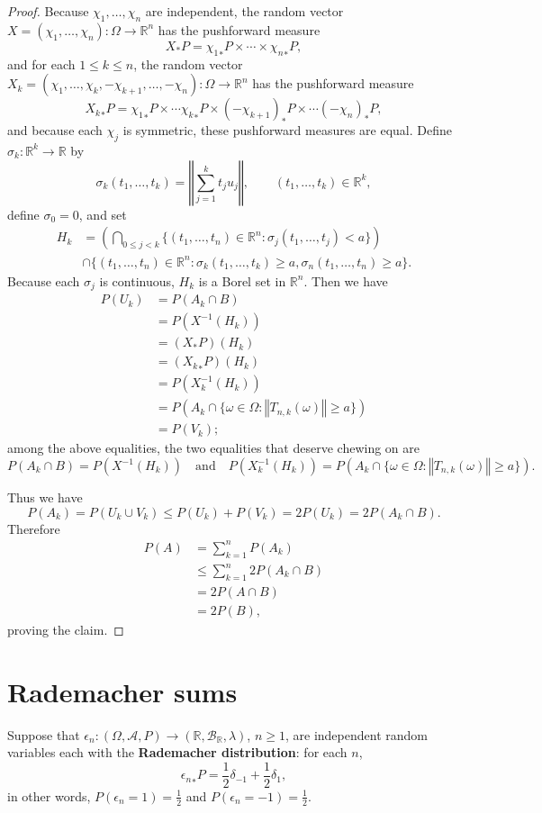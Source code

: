 \documentclass{article}
\newcommand{\norm}[1]{\left\Vert #1 \right\Vert}
\theoremstyle{definition}
\begin{document}
\begin{proof}
Because $\chi_1,\ldots,\chi_n$  are independent,
the random vector $X=(\chi_1,\ldots,\chi_n):\Omega \to \mathbb{R}^n$ has the pushforward measure
\[	
X_*P = {\chi_1}_*P \times \cdots  \times {\chi_n}_*P,
\]
 and for each $1 \leq k \leq n$, the random vector
$X_k=(\chi_1,\ldots,\chi_k,-\chi_{k+1},\ldots,-\chi_n):\Omega \to \mathbb{R}^n$ has the pushforward measure
\[
{X_k}_*P={\chi_1}_*P \times \cdots {\chi_k}_*P \times {(-\chi_{k+1})}_*P \times \cdots {(-\chi_n)}_*P,
\]
and because each $\chi_j$ is symmetric, these pushforward measures are equal. 
Define $\sigma_k:\mathbb{R}^k \to \mathbb{R}$ by
\[
\sigma_k(t_1,\ldots,t_k) = \norm{\sum_{j=1}^k t_j u_j}, \qquad (t_1,\ldots,t_k) \in \mathbb{R}^k,
\]
define $\sigma_0=0$,
and set
\begin{align*}
H_k& = \left( \bigcap_{0 \leq j < k} \{(t_1,\ldots,t_n) \in \mathbb{R}^n: \sigma_j(t_1,\ldots,t_j)<a\} \right)\\
& \cap \{(t_1,\ldots,t_n) \in \mathbb{R}^n:
\sigma_k(t_1,\ldots,t_k) \geq a, \sigma_n(t_1,\ldots,t_n) \geq a\}.
\end{align*}
Because each $\sigma_j$ is continuous, $H_k$ is a Borel set in $\mathbb{R}^n$.
Then we have
\begin{align*}
P(U_k)&=P(A_k \cap B)\\
&=P(X^{-1}(H_k))\\
&=(X_*P)(H_k)\\
&=({X_k}_*P)(H_k)\\
&=P(X_k^{-1}(H_k))\\
&=P(A_k \cap \{\omega \in \Omega: \norm{T_{n,k}(\omega)} \geq a\})\\
&=P(V_k);
\end{align*}
among the above equalities, the two equalities that deserve chewing on are
\[
P(A_k \cap B) = P(X^{-1}(H_k)) \quad \textrm{and} \quad P(X_k^{-1}(H_k)) = P(A_k \cap \{\omega \in \Omega: \norm{T_{n,k}(\omega)} \geq a\}).
\]

Thus we have
\[
P(A_k) = P(U_k \cup V_k) \leq P(U_k)+P(V_k) = 2P(U_k) = 2P(A_k \cap B).
\]
Therefore
\begin{align*}
P(A)&=\sum_{k=1}^n P(A_k)\\
&\leq \sum_{k=1}^n 2P(A_k \cap B)\\
&=2 P(A \cap B)\\
&= 2P(B),
\end{align*}
proving the claim.
\end{proof}




\section{Rademacher sums}
Suppose that 
$\epsilon_n:(\Omega,\mathscr{A},P) \to (\mathbb{R},\mathscr{B}_{\mathbb{R}},\lambda)$, $n \geq 1$, are independent random variables each with the \textbf{Rademacher distribution}: for each $n$,
\[
{\epsilon_n}_*P = \frac{1}{2}\delta_{-1}+\frac{1}{2}\delta_1,
\]
in other words, $P(\epsilon_n=1)=\frac{1}{2}$ and $P(\epsilon_n=-1)=\frac{1}{2}$. 
\end{document}
